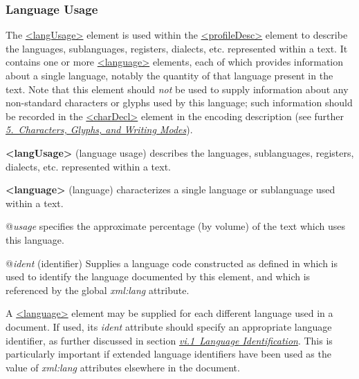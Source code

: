 \subsubsection[{Language Usage}]{Language Usage}\label{HD41}\par
The \hyperref[TEI.langUsage]{<langUsage>} element is used within the \hyperref[TEI.profileDesc]{<profileDesc>} element to describe the languages, sublanguages, registers, dialects, etc. represented within a text. It contains one or more \hyperref[TEI.language]{<language>} elements, each of which provides information about a single language, notably the quantity of that language present in the text. Note that this element should \textit{not} be used to supply information about any non-standard characters or glyphs used by this language; such information should be recorded in the \hyperref[TEI.charDecl]{<charDecl>} element in the encoding description (see further \textit{\hyperref[WD]{5.\ Characters, Glyphs, and Writing Modes}}). 
\begin{sansreflist}
  
\item [\textbf{<langUsage>}] (language usage) describes the languages, sublanguages, registers, dialects, etc. represented within a text.
\item [\textbf{<language>}] (language) characterizes a single language or sublanguage used within a text.\hfil\\[-10pt]\begin{sansreflist}
    \item[@{\itshape usage}]
  specifies the approximate percentage (by volume) of the text which uses this language.
    \item[@{\itshape ident}]
  (identifier) Supplies a language code constructed as defined in  which is used to identify the language documented by this element, and which is referenced by the global {\itshape xml:lang} attribute.
\end{sansreflist}  
\end{sansreflist}
\par
A \hyperref[TEI.language]{<language>} element may be supplied for each different language used in a document. If used, its {\itshape ident} attribute should specify an appropriate language identifier, as further discussed in section \textit{\hyperref[CHSH]{vi.1\ Language Identification}}. This is particularly important if extended language identifiers have been used as the value of {\itshape xml:lang} attributes elsewhere in the document.\par
